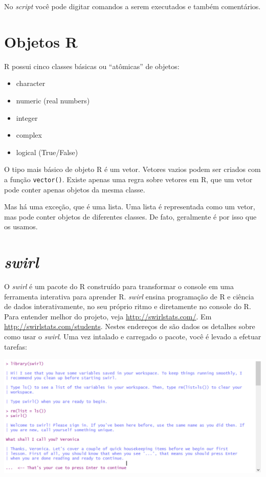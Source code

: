 \documentclass[]{book}
\begin{document}
No \emph{script} você pode digitar comandos a serem executados e também comentários.

\hypertarget{objetos-r}{%
\section{Objetos R}\label{objetos-r}}

R possui cinco classes básicas ou ``atômicas'' de objetos:

\begin{itemize}
\item
  character
\item
  numeric (real numbers)
\item
  integer
\item
  complex
\item
  logical (True/False)
\end{itemize}

O tipo mais básico de objeto R é um vetor. Vetores vazios podem ser criados com a função \texttt{vector()}. Existe apenas uma regra sobre vetores em R, que um vetor pode conter apenas objetos da mesma classe.

Mas há uma exceção, que é uma lista. Uma lista é representada como um vetor, mas pode conter objetos de diferentes classes. De fato, geralmente é por isso que os usamos.

\hypertarget{swirl}{%
\section{\texorpdfstring{\emph{swirl}}{swirl}}\label{swirl}}

O \emph{swirl} é um pacote do R construído para transformar o console em uma ferramenta interativa para aprender R. \emph{swirl} ensina programação de R e ciência de dados interativamente, no seu próprio ritmo e diretamente no console do R. Para entender melhor do projeto, veja \url{http://swirlstats.com/}. Em \url{http://swirlstats.com/students}. Nestes endereços de são dados os detalhes sobre como usar o \emph{swirl}. Uma vez intalado e carregado o pacote, você é levado a efetuar tarefas:

\begin{center}\includegraphics[width=0.9\linewidth]{imagens/swirl} \end{center}
\end{document}
